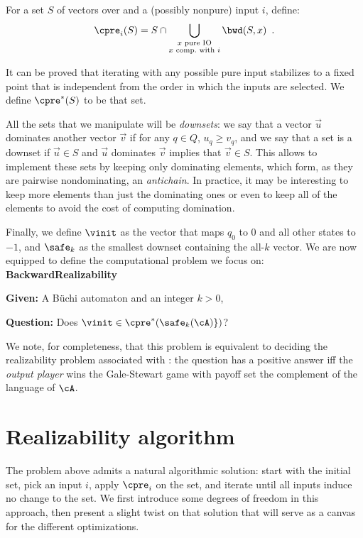 \documentclass[sigconf,screen,nonacm]{acmart}
\begin{document}
For a set \(S\) of vectors over \cA and a (possibly nonpure) input \(i\), define:
\[\cpre_i(S) = S \cap \bigcup_{\substack{x \text{ pure IO}\\x \text{ comp.\ with } i}} \bwd(S, x)\enspace.\]

It can be proved that iterating \cpre with any possible pure input stabilizes to
a fixed point that is independent from the order in which the inputs are
selected.  We define \(\cpre^*(S)\) to be that set.

All the sets that we manipulate will be \emph{downsets}: we say that a vector
\(\vec{u}\) dominates another vector \(\vec{v}\) if for any \(q \in Q\),
\(u_q \geq v_q\), and we say that a set is a downset if \(\vec{u} \in S\) and
\(\vec{u}\) dominates \(\vec{v}\) implies that \(\vec{v} \in S\).  This allows to
implement these sets by keeping only dominating elements, which form, as they
are pairwise nondominating, an \emph{antichain}.  In practice, it may be
interesting to keep more elements than just the dominating ones or even to keep
all of the elements to avoid the cost of computing domination.

Finally, we define \(\vinit\) as the vector that maps \(q_0\) to \(0\) and all other
states to \(-1\), and \(\safe_k\) as the smallest downset containing the
all-\(k\) vector.
We are now equipped to define the computational problem we focus on:\\[1em]
\textbf{BackwardRealizability}
\begin{compactitem}
\item \textbf{Given:} A Büchi automaton \cA and an integer \(k > 0\),
\item \textbf{Question:} Does \(\vinit \in \cpre^*(\safe_k(\cA)\})\)?
\end{compactitem}
\vspace{1em}

We note, for completeness, that this problem is equivalent to deciding the
realizability problem associated with \cA: the question has a positive answer
iff the \emph{output player} wins the Gale-Stewart game with payoff set the
complement of the language of \(\cA\).

\section{Realizability algorithm}

The problem above admits a natural algorithmic solution: start with the initial
set, pick an input \(i\), apply \(\cpre_i\) on the set, and iterate until all inputs
induce no change to the set.  We first introduce some degrees of freedom in this
approach, then present a slight twist on that solution that will serve as a
canvas for the different optimizations.
\end{document}
